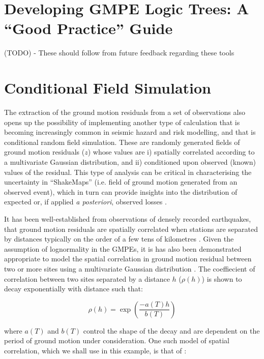 \section{Developing GMPE Logic Trees: A ``Good Practice'' Guide}
\label{sec:logic_tree}

(TODO) - These should follow from future feedback regarding these tools

\section{Conditional Field Simulation}
\label{sec:cond_field}

The extraction of the ground motion residuals from a set of observations also opens up the possibility of implementing another type of calculation that is becoming increasingly common in seismic hazard and risk modelling, and that is conditional random field simulation. These are randomly generated fields of ground motion residuals ($z$) whose values are i) spatially correlated according to a multivariate Gaussian distribution, and ii) conditioned upon observed (known) values of the residual. This type of analysis can be critical in characterising the uncertainty in ``ShakeMaps'' (i.e. field of ground motion generated from an observed event), which in turn can provide insights into the distribution of expected or, if applied \emph{a posteriori}, observed losses \parencite[e.g.][]{Park_etal2007, Crowley_etal2008b, Stafford2012}.

It has been well-established from observations of densely recorded earthquakes, that ground motion residuals are spatially correlated when stations are separated by distances typically on the order of a few tens of kilometres \parencite{Jayaram2009}. Given the assumption of lognormality in the GMPEs, it is has also been demonstrated appropriate to model the spatial correlation in ground motion residual between two or more sites using a multivariate Gaussian distribution \parencite{JayaramBaker2009}. The coeffiecient of correlation between two sites separated by a distance $h$ ($\rho \left( h \right)$) is shown to decay exponentially with distance such that:

\begin{equation}
\rho \left( h \right) = \exp \left( {\frac{-a\left(T\right) h}{b \left(T\right)}} \right)
\end{equation}

\noindent where $a\left( T \right)$ and $b\left( T \right)$ control the shape of the decay and are dependent on the period of ground motion under consideration. One such model of spatial correlation, which we shall use in this example, is that of \textcite{Jayaram2009}:

